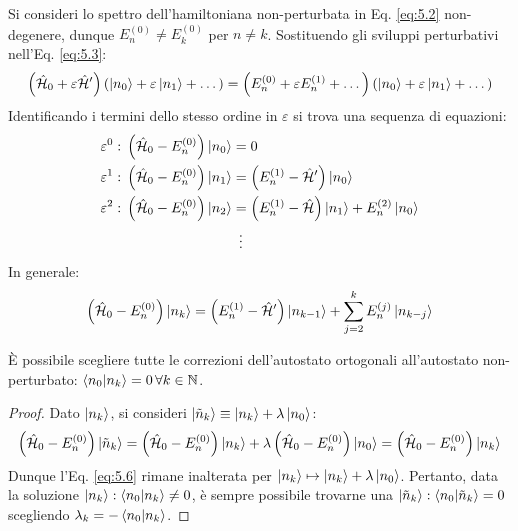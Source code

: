 Si consideri lo spettro dell'hamiltoniana non-perturbata in Eq. \ref{eq:5.2} non-degenere, dunque $ E_n^{(0)} \neq E_k^{(0)} $ per $ n \neq k $. Sostituendo gli sviluppi perturbativi nell'Eq. \ref{eq:5.3}:
\begin{equation*}
	\left( \hat{\mathcal{H}}_0 + \varepsilon \hat{\mathcal{H}}' \right) \left( \ket{n_0} + \varepsilon \ket{n_1} + \dots \right) = \left( E_n^{(0)} + \varepsilon E_n^{(1)} + \dots \right) \left( \ket{n_0} + \varepsilon \ket{n_1} + \dots \right)
\end{equation*}
Identificando i termini dello stesso ordine in $ \varepsilon $ si trova una sequenza di equazioni:
\begin{align*}
	\varepsilon^0 : \,\left( \hat{\mathcal{H}}_0 - E_n^{(0)} \right) \ket{n_0} &= 0 \\
	\varepsilon^1 : \,\left( \hat{\mathcal{H}}_0 - E_n^{(0)} \right) \ket{n_1} &= \left( E_n^{(1)} - \hat{\mathcal{H}}' \right) \ket{n_0} \\
	\varepsilon^2 : \,\left( \hat{\mathcal{H}}_0 - E_n^{(0)} \right) \ket{n_2} &= \left( E_n^{(1)} - \hat{\mathcal{H}} \right) \ket{n_1} + E_n^{(2)} \ket{n_0} \\
								 & \,\,\, \vdots
\end{align*}
In generale:
\begin{equation}
	\left( \hat{\mathcal{H}}_0 - E_n^{(0)} \right) \ket{n_k} = \left( E_n^{(1)} - \hat{\mathcal{H}}' \right) \ket{n_{k-1}} + \sum_{j = 2}^{k} E_n^{(j)} \ket{n_{k-j}}
	\label{eq:5.6}
\end{equation}

\begin{proposition}\label{pert-non-deg-spec}
	È possibile scegliere tutte le correzioni dell'autostato ortogonali all'autostato non-perturbato: $ \braket{n_0 | n_k} = 0 \,\forall k \in \mathbb{N} $.
\end{proposition}
\begin{proof}
	Dato $ \ket{n_k} $, si consideri $ \ket{\tilde{n}_k} \equiv \ket{n_k} + \lambda \ket{n_0} $:
	\begin{equation*}
		\left( \hat{\mathcal{H}}_0 - E_n^{(0)} \right) \ket{\tilde{n}_k}  = \left( \hat{\mathcal{H}}_0 - E_n^{(0)} \right) \ket{n_k} + \lambda \left( \hat{\mathcal{H}}_0 - E_n^{(0)} \right) \ket{n_0} = \left( \hat{\mathcal{H}}_0 - E_n^{(0)} \right) \ket{n_k}
	\end{equation*}
	Dunque l'Eq. \ref{eq:5.6} rimane inalterata per $ \ket{n_k} \mapsto \ket{n_k} + \lambda \ket{n_0} $. Pertanto, data la soluzione $ \ket{n_k} : \braket{n_0 | n_k} \neq 0 $, è sempre possibile trovarne una $ \ket{\tilde{n}_k} : \braket{n_0 | \tilde{n}_k} = 0 $  scegliendo $ \lambda_k = - \braket{n_0 | n_k} $.
\end{proof}

